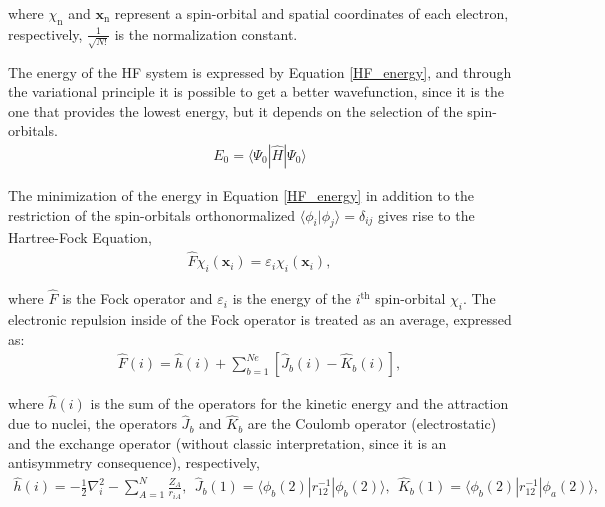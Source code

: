 \noindent where $\chi_\mathrm{n}$ and $\mathbf{x}_\mathrm{n}$ represent a spin-orbital and
spatial coordinates of each electron, respectively, $\frac{1}{\sqrt{N!}}$ is the
normalization constant.

The energy of the \gls{HF} system is expressed by Equation \ref{HF_energy}, and through
the variational principle it is possible to
get a better wavefunction, since it is the one
that provides the lowest energy, but it depends on the selection of the
spin-orbitals.
%
\begin{align}
E_0 = \langle \Psi_0 | \widehat{H} | \Psi_0 \rangle 
\label{HF_energy}
\end{align}

\newpage

The minimization of the energy in
Equation \ref{HF_energy} in addition to the restriction of the spin-orbitals
orthonormalized $\langle\phi_{i}|\phi_{j}\rangle = \delta_{ij}$ gives
rise to the Hartree-Fock
Equation,
\begin{align}
\widehat{F}\chi_{i}(\mathbf{x}_i)=\varepsilon_{i}\chi_{i}(\mathbf{x}_i),
\end{align}

\noindent where $\widehat{F}$ is the Fock operator and $\varepsilon_i$ is the energy
of the $i^{\mathrm{th}}$ spin-orbital $\chi_i$. The electronic repulsion inside of the
Fock operator is treated as an average, expressed as:
%
\begin{align} %
\widehat{F} (i) = \widehat{h}(i) + \sum_{b=1}^{Ne} [\hat{J}_b (i) - \hat{K}_b (i)],
\end{align}

\noindent where $\widehat{h}(i)$ is the sum of the operators for the kinetic
energy and the attraction due to nuclei, the operators $\hat{J}_b$ and
$\hat{K}_b$ are the Coulomb operator (electrostatic) and the exchange operator
(without classic interpretation, since it is an antisymmetry consequence),
respectively,
%
\begin{align}
\widehat{h}(i) = -\frac{1}{2}\nabla^{2}_{i} -\sum_{A=1}^{N}\frac{Z_{A}}{r_{iA}}, \ \ 
\hat{J}_b (1) = \langle\phi_{b}(2) | r_{12}^{-1} | \phi_{b}(2)\rangle , \ \ 
\hat{K}_b (1) = \langle\phi_{b}(2) | r_{12}^{-1} | \phi_{a}(2)\rangle ,
\end{align}

